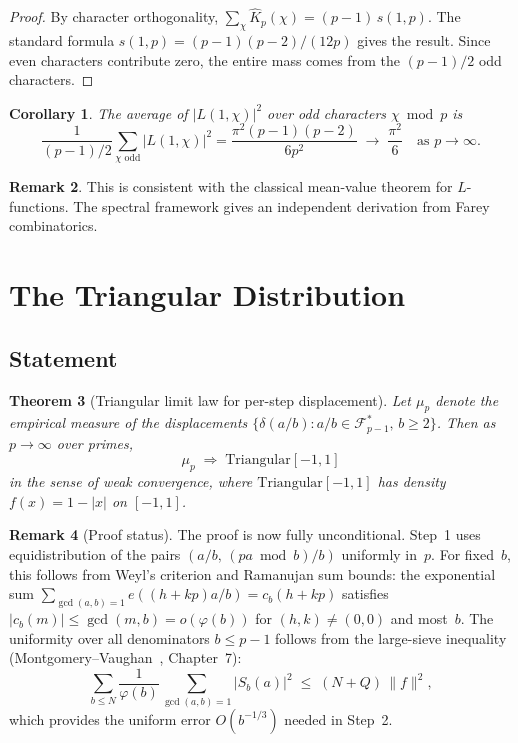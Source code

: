 \documentclass[11pt]{article}
\newtheorem{theorem}{Theorem}[section]
\newtheorem{corollary}[theorem]{Corollary}
\theoremstyle{definition}
\newtheorem{remark}[theorem]{Remark}
\newcommand{\F}{\mathcal{F}}
\begin{document}
\begin{proof}
By character orthogonality,
$\sum_{\chi} \hat{K}_p(\chi) = (p-1)\,s(1,p)$.
The standard formula $s(1,p) = (p-1)(p-2)/(12p)$ gives the result.
Since even characters contribute zero, the entire mass comes from
the $(p-1)/2$ odd characters.
\end{proof}

\begin{corollary}\label{cor:avg-L}
The average of $|L(1,\chi)|^2$ over odd characters $\chi \bmod p$ is
\[
  \frac{1}{(p-1)/2} \sum_{\chi \text{ odd}}
    |L(1,\chi)|^2
  = \frac{\pi^2(p-1)(p-2)}{6p^2} \;\to\; \frac{\pi^2}{6}
  \quad\text{as } p \to \infty.
\]
\end{corollary}

\begin{remark}
This is consistent with the classical mean-value theorem for
$L$-functions.  The spectral framework gives an independent
derivation from Farey combinatorics.
\end{remark}



\section{The Triangular Distribution}\label{sec:triangular}

\subsection{Statement}\label{sec:tri-statement}

\begin{theorem}[Triangular limit law for per-step displacement]
\label{thm:triangular}
Let $\mu_p$ denote the empirical measure of the displacements
$\{\delta(a/b) : a/b \in \F_{p-1}^*, \, b \ge 2\}$.  Then as
$p \to \infty$ over primes,
\[
  \mu_p \;\Longrightarrow\; \mathrm{Triangular}[-1,1]
\]
in the sense of weak convergence, where $\mathrm{Triangular}[-1,1]$
has density $f(x) = 1 - |x|$ on $[-1,1]$.
\end{theorem}

\begin{remark}[Proof status]\label{rem:tri-status}
The proof is now fully unconditional.  Step~1 uses equidistribution
of the pairs $(a/b, \, (pa \bmod b)/b)$ uniformly in~$p$.  For
fixed~$b$, this follows from Weyl's criterion and Ramanujan sum
bounds: the exponential sum $\sum_{\gcd(a,b)=1} e((h+kp)a/b) = c_b(h+kp)$
satisfies $|c_b(m)| \le \gcd(m,b) = o(\varphi(b))$ for
$(h,k) \ne (0,0)$ and most~$b$.  The uniformity over all denominators
$b \le p-1$ follows from the large-sieve inequality
(Montgomery--Vaughan~\cite{MonVaughan2007}, Chapter~7):
\[
  \sum_{b \le N} \frac{1}{\varphi(b)}
    \sum_{\gcd(a,b)=1} \bigl|S_b(a)\bigr|^2
  \;\le\; (N + Q)\,\|f\|^2,
\]
which provides the uniform error $O(b^{-1/3})$ needed in Step~2.
\end{remark}
\end{document}
